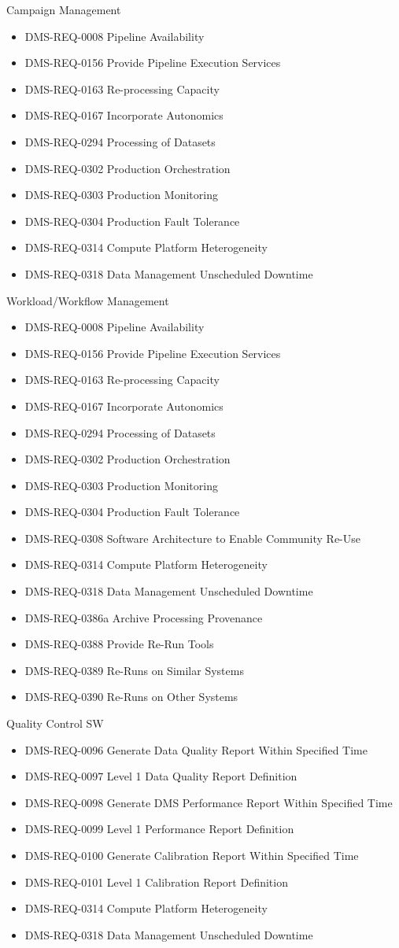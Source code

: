 Campaign Management \begin{itemize}
\item DMS-REQ-0008 Pipeline Availability
\item DMS-REQ-0156 Provide Pipeline Execution Services
\item DMS-REQ-0163 Re-processing Capacity
\item DMS-REQ-0167 Incorporate Autonomics
\item DMS-REQ-0294 Processing of Datasets
\item DMS-REQ-0302 Production Orchestration
\item DMS-REQ-0303 Production Monitoring
\item DMS-REQ-0304 Production Fault Tolerance
\item DMS-REQ-0314 Compute Platform Heterogeneity
\item DMS-REQ-0318 Data Management Unscheduled Downtime
\end{itemize}
Workload/Workflow Management \begin{itemize}
\item DMS-REQ-0008 Pipeline Availability
\item DMS-REQ-0156 Provide Pipeline Execution Services
\item DMS-REQ-0163 Re-processing Capacity
\item DMS-REQ-0167 Incorporate Autonomics
\item DMS-REQ-0294 Processing of Datasets
\item DMS-REQ-0302 Production Orchestration
\item DMS-REQ-0303 Production Monitoring
\item DMS-REQ-0304 Production Fault Tolerance
\item DMS-REQ-0308 Software Architecture to Enable Community Re-Use
\item DMS-REQ-0314 Compute Platform Heterogeneity
\item DMS-REQ-0318 Data Management Unscheduled Downtime
\item DMS-REQ-0386a Archive Processing Provenance
\item DMS-REQ-0388 Provide Re-Run Tools
\item DMS-REQ-0389 Re-Runs on Similar Systems
\item DMS-REQ-0390 Re-Runs on Other Systems
\end{itemize}
Quality Control SW \begin{itemize}
\item DMS-REQ-0096 Generate Data Quality Report Within Specified Time
\item DMS-REQ-0097 Level 1 Data Quality Report Definition
\item DMS-REQ-0098 Generate DMS Performance Report Within Specified Time
\item DMS-REQ-0099 Level 1 Performance Report Definition
\item DMS-REQ-0100 Generate Calibration Report Within Specified Time
\item DMS-REQ-0101 Level 1 Calibration Report Definition
\item DMS-REQ-0314 Compute Platform Heterogeneity
\item DMS-REQ-0318 Data Management Unscheduled Downtime
\end{itemize}
